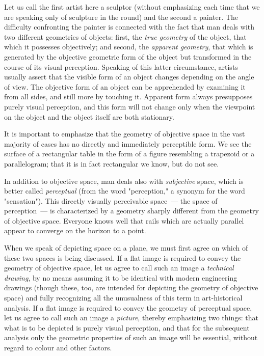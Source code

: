 Let us call the first artist here a sculptor (without emphasizing each time that we are
speaking only of sculpture in the round) and the second a painter. The difficulty
confronting the painter is connected with the fact that man deals with two different
geometries of objects: first, the \textit{true geometry} of the object, that which it
possesses objectively; and second, the \textit{apparent geometry}, that which is
generated by the objective geometric form of the object but transformed in the course of
its visual perception. Speaking of this latter circumstance, artists usually assert that the
visible form of an object changes depending on the angle of view. The objective form of
an object can be apprehended by examining it from all sides, and still more by touching
it. Apparent form always presupposes purely visual perception, and this form will not
change only when the viewpoint on the object and the object itself are both stationary.


It is important to emphasize that the geometry of objective space in the vast majority
of cases has no directly and immediately perceptible form. We see the surface of a
rectangular table in the form of a figure resembling a trapezoid or a parallelogram; that
it is in fact rectangular we know, but do not see.

In addition to objective space, man deals also with \textit{subjective} space, which is
better called \textit{perceptual} (from the word "perception," a synonym for the word
"sensation"). This directly visually perceivable space~--- the space of perception~--- is
characterized by a geometry sharply different from the geometry of objective space.
Everyone knows well that rails which are actually parallel appear to converge on the
horizon to a point.

When we speak of depicting space on a plane, we must first agree on which of these
two spaces is being discussed. If a flat image is required to convey the geometry of
objective space, let us agree to call such an image a \textit{technical drawing}, by no
means assuming it to be identical with modern engineering drawings (though these, too,
are intended for depicting the geometry of objective space) and fully recognizing all the
unusualness of this term in art-historical analysis. If a flat image is required to convey
the geometry of perceptual space, let us agree to call such an image a \textit{picture},
thereby emphasizing two things: that what is to be depicted is purely visual perception,
and that for the subsequent analysis only the geometric properties of such an image will
be essential, without regard to colour and other factors.

